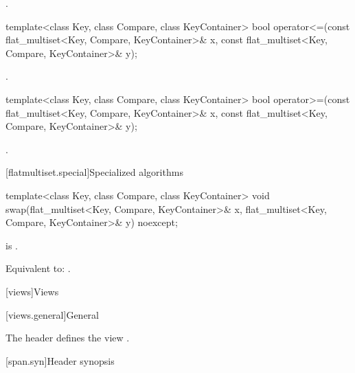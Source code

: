 \begin{codeblock}
\begin{codeblock}
\begin{codeblock}
\begin{addedblock}
\begin{itemdescr}
\pnum \returns {}.
\end{itemdescr}

%
\begin{itemdecl}
template<class Key, class Compare, class KeyContainer>
  bool operator<=(const flat_multiset<Key, Compare, KeyContainer>& x,
                  const flat_multiset<Key, Compare, KeyContainer>& y);
\end{itemdecl}

\begin{itemdescr}
\pnum \returns {}.
\end{itemdescr}

%
\begin{itemdecl}
template<class Key, class Compare, class KeyContainer>
  bool operator>=(const flat_multiset<Key, Compare, KeyContainer>& x,
                  const flat_multiset<Key, Compare, KeyContainer>& y);
\end{itemdecl}

\begin{itemdescr}
\pnum \returns {}.
\end{itemdescr}

[flatmultiset.special]{Specialized algorithms}

%
\begin{itemdecl}
template<class Key, class Compare, class KeyContainer>
  void swap(flat_multiset<Key, Compare, KeyContainer>& x,
            flat_multiset<Key, Compare, KeyContainer>& y) noexcept;
\end{itemdecl}

\begin{itemdescr}
\pnum \constraints {} is .

\pnum
\effects Equivalent to: .
\end{itemdescr}
\end{addedblock}

[views]{Views}

[views.general]{General}

\pnum
The header  defines the view .

[span.syn]{Header  synopsis}%
%


\end{codeblock}
\end{codeblock}
\end{codeblock}
